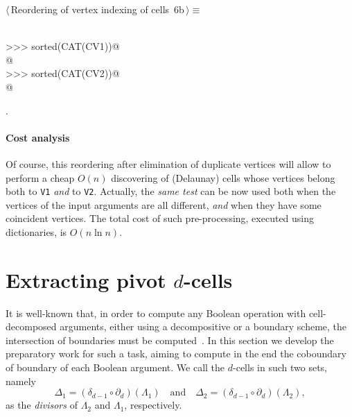 \documentclass[11pt,oneside]{article}	%
\begin{document}
\begin{flushleft} \small \label{scrap11}
\protect{}$\langle\,$Reordering of vertex indexing of cells\nobreak\ {\footnotesize 6b}$\,\rangle\equiv$
\vspace{-1ex}
\begin{list}{}{} \item
\mbox{}\verb@@\\
\mbox{}\verb@>>> sorted(CAT(CV1))@\\
\mbox{}\verb@[0, 1, 1, 2, 3, 4, 5, 5]@\\
\mbox{}\verb@>>> sorted(CAT(CV2))@\\
\mbox{}\verb@[3, 4, 5, 6, 7, 7, 8, 8, 9, 10, 11]@\\
\mbox{}\verb@@{\NWsep}
\end{list}
\vspace{-1ex}
\footnotesize\addtolength{\baselineskip}{-1ex}
\begin{list}{}{\setlength{\itemsep}{-\parsep}\setlength{\itemindent}{-\leftmargin}}
\item {\NWtxtMacroNoRef}.
\end{list}
\end{flushleft}
\paragraph{Cost analysis} 
Of course, this reordering after elimination of duplicate vertices will allow to perform a cheap $O(n)$ discovering of (Delaunay) cells whose vertices belong both to \texttt{V1} \emph{and} to \texttt{V2}. 
Actually, the \emph{same test} can be now used both when the vertices of the input arguments are all different, \emph{and} when they have some coincident vertices.
The total cost of such pre-processing, executed using dictionaries, is $O(n\ln n)$.


\section{Extracting pivot $d$-cells}

It is well-known that, in order to compute any Boolean operation with cell-decomposed arguments, either using a decompositive or a boundary scheme, the intersection of boundaries must be computed~\cite{Paoluzzi:1989:BAO:70248.70249}. In this section we develop the preparatory work for such a task, aiming to compute in the end the coboundary of boundary of each Boolean argument. We call the $d$-cells in such two sets, namely
\[
\Delta_1 = (\delta_{d-1}\circ\partial_d)(\Lambda_1)
\quad\mbox{and}\quad
\Delta_2 = (\delta_{d-1}\circ\partial_d)(\Lambda_2),
\]
as the \emph{divisors} of $\Lambda_2$ and $\Lambda_1$, respectively.
\end{document}

